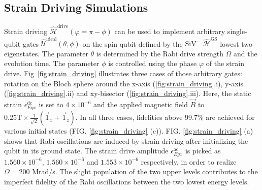 \subsection{Strain Driving Simulations}
\label{sec:straindriving}

Strain driving \(\hat{\mathcal{H}}^{\text{drive}}(\varphi=\pi-\phi)\) can be used to implement arbitrary single-qubit gates $\hat{\mathcal{U}}^{\text{ideal}}(\theta,\phi)$ on the spin qubit defined by the \(\mathrm{SiV}^{-}\) $\hat{\mathcal{H}}^{\text{GS}}$ lowest two eigenstates. The parameter $\theta$ is determined by the Rabi drive strength $\Omega$ and the evolution time. The parameter $\phi$ is controlled using the phase $\varphi$ of the strain drive. Fig~\ref{fig:strain_driving} illustrates three cases of those arbitrary gates: rotation on the Bloch sphere around the x-axis (\ref{fig:strain_driving}.i), y-axis (\ref{fig:strain_driving}.ii) and xy-bisector (\ref{fig:strain_driving}.iii). Here, the static strain $\epsilon_{Egx}^{\text{dc}}$ is set to $4\times10^{-6}$ and the applied magnetic field $\vec{B}$ to $0.25\text{T}\times\frac{1}{\sqrt{2}}(\vec{1}_x+\vec{1}_z)$. In all three cases, fidelities above 99.7\% are achieved for various initial states  (FIG. \ref{fig:strain_driving} (c)). FIG. \ref{fig:strain_driving} (a) shows that Rabi oscillations are induced by strain driving after initializing the qubit in its ground state. The strain drive amplitude $\epsilon_{Egx}^{\text{ac}}$ is picked as $1.560\times10^{-6}$, $1.560\times10^{-6}$ and $1.553\times10^{-6}$ respectively, in order to realize $\Omega=200$ Mrad/s. The slight population of the two upper levels contributes to the imperfect fidelity of the Rabi oscillations between the two lowest energy levels. 

